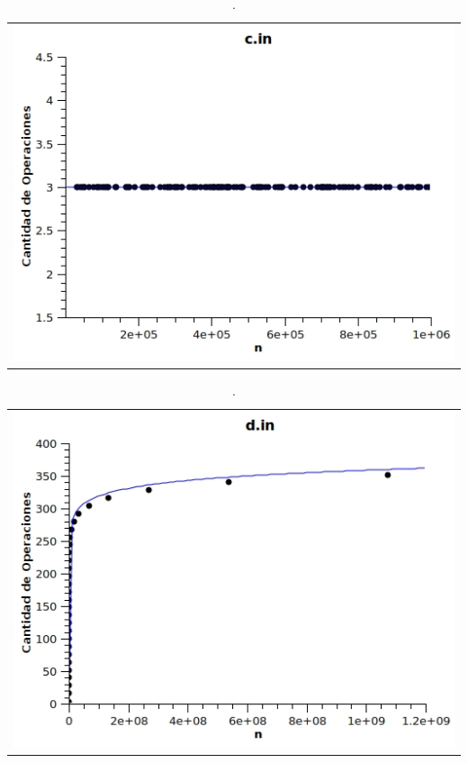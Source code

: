 	\begin{table}[ht]
		\centering 
			\begin{tabular}{c}
				\includegraphics[scale = 0.8]{./../ej1/tests/c.jpg}
			\end{tabular}
			\caption{.}
			\label{grafico3} 
	\end{table}

	\begin{table}[ht]
		\centering 
			\begin{tabular}{c}
				\includegraphics[scale = 0.8]{./../ej1/tests/d.jpg}
			\end{tabular}
			\caption{.} 
			\label{grafico4} 
	\end{table}

